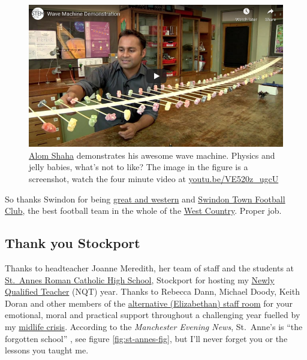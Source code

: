 \documentclass[
]{book}
\begin{document}
\begin{figure}

{\centering \includegraphics[width=0.99\linewidth]{images/youtube-alom} 

}

\caption{\href{https://alomshaha.com/}{Alom Shaha} demonstrates his awesome wave machine. Physics and jelly babies, what's not to like? \citep{youtube-alom} The image in the figure is a screenshot, watch the four minute video at \href{https://youtu.be/VE520z_ugcU}{youtu.be/VE520z\_ugcU}}\label{fig:shaha-fig}
\end{figure}



So thanks Swindon for being \href{https://en.wikipedia.org/wiki/Great_Western_Railway}{great and western} and \href{https://en.wikipedia.org/wiki/Swindon_Town_F.C.}{Swindon Town Football Club}, the best football team in the whole of the \href{https://en.wikipedia.org/wiki/West_Country}{West Country}. Proper job. 🙏

\hypertarget{stockport}{%
\subsection{Thank you Stockport}\label{stockport}}

Thanks to headteacher Joanne Meredith, her team of staff and the students at \href{https://en.wikipedia.org/wiki/St_Anne\%27s_RC_Voluntary_Academy}{St.~Annes Roman Catholic High School}, Stockport for hosting my \href{https://en.wikipedia.org/wiki/Newly_qualified_teacher}{Newly Qualified Teacher} (NQT) year. Thanks to Rebecca Dann, Michael Doody, Keith Doran and other members of the \href{https://www.elizabethanstockport.co.uk/}{alternative (Elizabethan) staff room} for your emotional, moral and practical support throughout a challenging year fuelled by my \href{https://en.wikipedia.org/wiki/Midlife_crisis}{midlife crisis}. According to the \emph{Manchester Evening News}, St.~Anne's is ``the forgotten school'' \citep{stannes1, stannes2}, see figure \ref{fig:st-annes-fig}, but I'll never forget you or the lessons you taught me.
\end{document}
